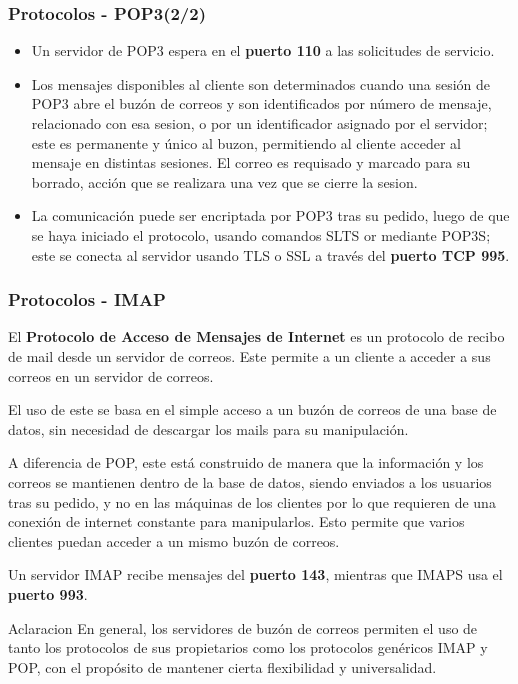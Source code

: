 \documentclass{beamer}
\begin{document}
\begin{frame}
\frametitle{Protocolos -  POP3(2/2)}
\tableofcontents
\begin{itemize}
\item \small Un servidor de POP3 espera en el \textbf{puerto 110} a las solicitudes de servicio.
\item \small Los mensajes disponibles al cliente son determinados cuando una sesión de POP3 abre el buzón de correos y son identificados por número de mensaje, relacionado con esa sesion, o por un identificador asignado por el servidor; este es permanente y único al buzon, permitiendo al cliente acceder al mensaje en distintas sesiones. El correo es requisado y marcado para su borrado, acción que se realizara una vez que se cierre la sesion.
\item \small La comunicación puede ser encriptada por POP3 tras su pedido,  luego de que se haya iniciado el protocolo, usando comandos SLTS or mediante POP3S; este se conecta al servidor usando TLS o SSL a través del \textbf{puerto TCP 995}.
\end{itemize}
\end{frame}

\begin{frame}
\frametitle{Protocolos - IMAP}
\tableofcontents
\small El \textbf{ Protocolo de Acceso de Mensajes de Internet} es un protocolo de recibo de mail desde un servidor de correos. Este permite a un cliente a acceder a sus correos en un servidor de correos.

\small El uso de este se basa en el simple acceso a un buzón de correos de una base de datos, sin necesidad de descargar los mails para su manipulación. 

\small A diferencia de POP, este está construido de manera que la información y los correos se mantienen dentro de la base de datos, siendo enviados a los usuarios tras su pedido, y no en las máquinas de los clientes por lo que requieren de una conexión de internet constante para manipularlos. Esto permite que varios clientes puedan acceder a un mismo buzón de correos.

\small Un servidor IMAP recibe mensajes del \textbf{puerto 143}, mientras que IMAPS usa el \textbf{puerto 993}.

\begin{block}{Aclaracion}
\small En general, los servidores de buzón de correos permiten el uso de tanto los protocolos de sus propietarios como los protocolos genéricos IMAP y POP, con el propósito de mantener cierta flexibilidad y universalidad.
\end{block}

\end{frame}
\end{document}
